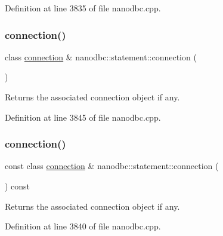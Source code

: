 Definition at line 3835 of file nanodbc.\+cpp.

\mbox{\label{classnanodbc_1_1statement_a4eb59e468b303a9d6acbe3ba1c408495}} 
\subsubsection{\texorpdfstring{connection()}{connection()}\hspace{0.1cm}{\footnotesize\ttfamily [1/2]}}
{\footnotesize\ttfamily class \mbox{\hyperlink{classnanodbc_1_1connection}{connection}} \& nanodbc\+::statement\+::connection (\begin{DoxyParamCaption}{ }\end{DoxyParamCaption})}



Returns the associated connection object if any. 



Definition at line 3845 of file nanodbc.\+cpp.

\mbox{\label{classnanodbc_1_1statement_ae2e4f53a94056c5280fc5919c7bf5086}} 
\subsubsection{\texorpdfstring{connection()}{connection()}\hspace{0.1cm}{\footnotesize\ttfamily [2/2]}}
{\footnotesize\ttfamily const class \mbox{\hyperlink{classnanodbc_1_1connection}{connection}} \& nanodbc\+::statement\+::connection (\begin{DoxyParamCaption}{ }\end{DoxyParamCaption}) const}



Returns the associated connection object if any. 



Definition at line 3840 of file nanodbc.\+cpp.

\mbox{\label{classnanodbc_1_1statement_a7b96b992fb9891b46411c300b017fe74}} 
